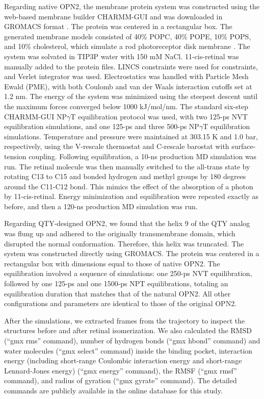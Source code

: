 \documentclass[fleqn, 10pt]{manuscript}
\begin{document}
Regarding native OPN2, the membrane protein system was constructed using the web-based membrane builder CHARMM-GUI and was downloaded in GROMACS format \citep{Jo_2008, Wu_2014, Lee_2016}. The protein was centered in a rectangular box. The generated membrane models consisted of 40\% POPC, 40\% POPE, 10\% POPS, and 10\% cholesterol, which simulate a rod photoreceptor disk membrane \citep{Albert_2005}. The system was solvated in TIP3P water with 150 mM NaCl. 11-cis-retinal was manually added to the protein files. LINCS constraints were used for constraints, and Verlet integrator was used. Electrostatics was handled with Particle Mesh Ewald (PME), with both Coulomb and van der Waals interaction cutoffs set at 1.2 nm. The energy of the system was minimized using the steepest descent until the maximum forces converged below 1000 kJ/mol/nm. The standard six-step CHARMM-GUI NP$\gamma$T equilibration protocol \citep{Jo_2008} was used, with two 125-ps NVT equilibration simulations, and one 125-ps and three 500-ps NP$\gamma$T equilibration simulations. Temperature and pressure were maintained at 303.15 K and 1.0 bar, respectively, using the V-rescale thermostat and C-rescale barostat with surface-tension coupling. Following equilibration, a 10-ns production MD simulation was run. The retinal molecule was then manually switched to the all-trans state by rotating C13 to C15 and bonded hydrogen and methyl groups by 180 degrees around the C11-C12 bond. This mimics the effect of the absorption of a photon by 11-cis-retinal. Energy minimization and equilibration were repeated exactly as before, and then a 120-ns production MD simulation was run. 

Regarding QTY-designed OPN2, we found that the helix 9 of the QTY analog was flung up and adhered to the originally transmembrane domain, which disrupted the normal conformation. Therefore, this helix was truncated. The system was constructed directly using GROMACS. The protein was centered in a rectangular box with dimensions equal to those of native OPN2. The equilibration involved a sequence of simulations: one 250-ps NVT equilibration, followed by one 125-ps and one 1500-ps NPT equilibrations, totaling an equilibration duration that matches that of the natural OPN2. All other configurations and parameters are identical to those of the original OPN2.

After the simulations, we extracted frames from the trajectory to inspect the structures before and after retinal isomerization. We also calculated the RMSD (``gmx rms'' command), number of hydrogen bonds (``gmx hbond'' command) and water molecules (``gmx select'' command) inside the binding pocket, interaction energy (including short-range Coulombic interaction energy and short-range Lennard-Jones energy) (``gmx energy'' command), the RMSF (``gmx rmsf'' command), and radius of gyration (``gmx gyrate'' command). The detailed commands are publicly available in the online database for this study. 
\end{document}
